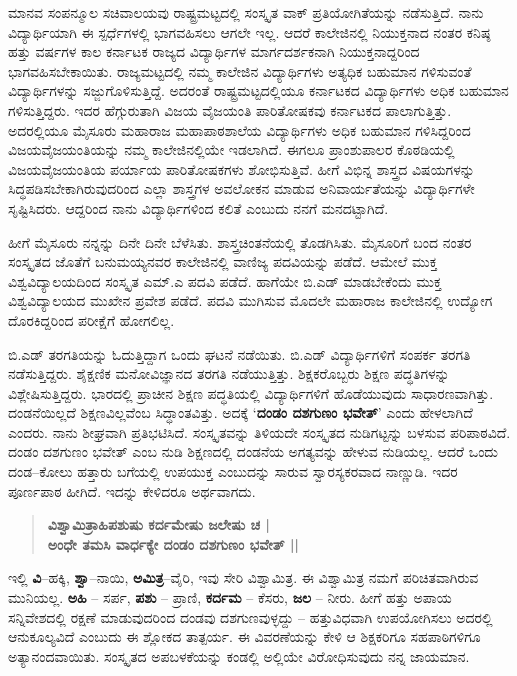 ಮಾನವ ಸಂಪನ್ಮೂಲ ಸಚಿವಾಲಯವು ರಾಷ್ಟ್ರಮಟ್ಟದಲ್ಲಿ ಸಂಸ್ಕೃತ ವಾಕ್ ಪ್ರತಿಯೋಗಿತೆಯನ್ನು ನಡೆಸುತ್ತಿದೆ.  ನಾನು ವಿದ್ಯಾರ್ಥಿಯಾಗಿ ಈ ಸ್ಪರ್ಧೆಗಳಲ್ಲಿ ಭಾಗವಹಿಸಲು ಆಗಲೇ ಇಲ್ಲ.  ಆದರೆ ಕಾಲೇಜಿನಲ್ಲಿ ನಿಯುಕ್ತನಾದ ನಂತರ ಕನಿಷ್ಠ ಹತ್ತು ವರ್ಷಗಳ ಕಾಲ ಕರ್ನಾಟಕ ರಾಜ್ಯದ ವಿದ್ಯಾರ್ಥಿಗಳ ಮಾರ್ಗದರ್ಶಕನಾಗಿ ನಿಯುಕ್ತನಾದ್ದರಿಂದ ಭಾಗವಹಿಸಬೇಕಾಯಿತು.  ರಾಜ್ಯಮಟ್ಟದಲ್ಲಿ ನಮ್ಮ ಕಾಲೇಜಿನ ವಿದ್ಯಾರ್ಥಿಗಳು ಅತ್ಯಧಿಕ ಬಹುಮಾನ ಗಳಿಸುವಂತೆ ವಿದ್ಯಾರ್ಥಿಗಳನ್ನು ಸಜ್ಜುಗೊಳಿಸುತ್ತಿದ್ದೆ.  ಅದರಂತೆ ರಾಷ್ಟ್ರಮಟ್ಟದಲ್ಲಿಯೂ ಕರ್ನಾಟಕದ ವಿದ್ಯಾರ್ಥಿಗಳು ಅಧಿಕ ಬಹುಮಾನ ಗಳಿಸುತ್ತಿದ್ದರು.  ಇದರ ಹೆಗ್ಗುರುತಾಗಿ ವಿಜಯ ವೈಜಯಂತಿ ಪಾರಿತೋಷಕವು ಕರ್ನಾಟಕದ ಪಾಲಾಗುತ್ತಿತ್ತು.  ಅದರಲ್ಲಿಯೂ ಮೈಸೂರು ಮಹಾರಾಜ ಮಹಾಪಾಠಶಾಲೆಯ ವಿದ್ಯಾರ್ಥಿಗಳು ಅಧಿಕ ಬಹುಮಾನ ಗಳಿಸಿದ್ದರಿಂದ ವಿಜಯವೈಜಯಂತಿಯನ್ನು ನಮ್ಮ ಕಾಲೇಜಿನಲ್ಲಿಯೇ ಇಡಲಾಗಿದೆ.  ಈಗಲೂ ಪ್ರಾಂಶುಪಾಲರ ಕೊಠಡಿಯಲ್ಲಿ ವಿಜಯವೈಜಯಂತಿಯ ಪರ್ಯಾಯ ಪಾರಿತೋಷಕಗಳು ಶೋಭಿಸುತ್ತಿವೆ.  ಹೀಗೆ ವಿಭಿನ್ನ ಶಾಸ್ತ್ರದ ವಿಷಯಗಳನ್ನು ಸಿದ್ಧಪಡಿಸಬೇಕಾಗಿರುವುದರಿಂದ ಎಲ್ಲಾ ಶಾಸ್ತ್ರಗಳ ಅವಲೋಕನ ಮಾಡುವ ಅನಿವಾರ್ಯತೆಯನ್ನು ವಿದ್ಯಾರ್ಥಿಗಳೇ ಸೃಷ್ಟಿಸಿದರು.   ಆದ್ದರಿಂದ ನಾನು ವಿದ್ಯಾರ್ಥಿಗಳಿಂದ ಕಲಿತೆ ಎಂಬುದು ನನಗೆ ಮನದಟ್ಟಾಗಿದೆ.  

ಹೀಗೆ ಮೈಸೂರು ನನ್ನನ್ನು ದಿನೇ ದಿನೇ ಬೆಳೆಸಿತು.  ಶಾಸ್ತ್ರಚಿಂತನೆಯಲ್ಲಿ ತೊಡಗಿಸಿತು.  ಮೈಸೂರಿಗೆ ಬಂದ ನಂತರ ಸಂಸ್ಕೃತದ ಜೊತೆಗೆ ಬನುಮಯ್ಯನವರ ಕಾಲೇಜಿನಲ್ಲಿ ವಾಣಿಜ್ಯ ಪದವಿಯನ್ನು ಪಡೆದೆ. ಆಮೇಲೆ ಮುಕ್ತ ವಿಶ್ವವಿದ್ಯಾಲಯದಿಂದ ಸಂಸ್ಕೃತ ಎಮ್.ಎ ಪದವಿ ಪಡೆದೆ. ಹಾಗೆಯೇ ಬಿ.ಎಡ್ ಮಾಡಬೇಕೆಂದು ಮುಕ್ತ ವಿಶ್ವವಿದ್ಯಾಲಯದ ಮುಖೇನ ಪ್ರವೇಶ ಪಡೆದೆ. ಪದವಿ ಮುಗಿಸುವ ಮೊದಲೇ ಮಹಾರಾಜ ಕಾಲೇಜಿನಲ್ಲಿ ಉದ್ಯೋಗ ದೊರಕಿದ್ದರಿಂದ ಪರೀಕ್ಷೆಗೆ ಹೋಗಲಿಲ್ಲ.  

ಬಿ.ಎಡ್ ತರಗತಿಯನ್ನು ಓದುತ್ತಿದ್ದಾಗ ಒಂದು ಘಟನೆ ನಡೆಯಿತು.  ಬಿ.ಎಡ್ ವಿದ್ಯಾರ್ಥಿಗಳಿಗೆ ಸಂಪರ್ಕ ತರಗತಿ ನಡೆಸುತ್ತಿದ್ದರು. ಶೈಕ್ಷಣಿಕ ಮನೋವಿಜ್ಞಾನದ ತರಗತಿ ನಡೆಯುತ್ತಿತ್ತು.  ಶಿಕ್ಷಕರೊಬ್ಬರು ಶಿಕ್ಷಣ ಪದ್ಧತಿಗಳನ್ನು ವಿಶ್ಲೇಷಿಸುತ್ತಿದ್ದರು.  ಭಾರದಲ್ಲಿ ಪ್ರಾಚೀನ ಶಿಕ್ಷಣ ಪದ್ಧತಿಯಲ್ಲಿ ವಿದ್ಯಾರ್ಥಿಗಳಿಗೆ ಹೊಡೆಯುವುದು ಸಾಧಾರಣವಾಗಿತ್ತು. ದಂಡನೆಯಿಲ್ಲದೆ ಶಿಕ್ಷಣವಿಲ್ಲವೆಂಬ ಸಿದ್ಧಾಂತವಿತ್ತು.  ಅದಕ್ಕೆ ‘\textbf{ದಂಡಂ ದಶಗುಣಂ ಭವೇತ್}’ ಎಂದು ಹೇಳಲಾಗಿದೆ ಎಂದರು.  ನಾನು ಶೀಘ್ರವಾಗಿ ಪ್ರತಿಭಟಿಸಿದೆ.  ಸಂಸ್ಕೃತವನ್ನು ತಿಳಿಯದೇ ಸಂಸ್ಕೃತದ ನುಡಿಗಟ್ಟನ್ನು ಬಳಸುವ ಪರಿಪಾಠವಿದೆ.  ದಂಡಂ ದಶಗುಣಂ ಭವೇತ್ ಎಂಬ ನುಡಿ ಶಿಕ್ಷಣದಲ್ಲಿ ದಂಡನೆಯ ಅಗತ್ಯವನ್ನು ಹೇಳುವ ನುಡಿಯಲ್ಲ.  ಆದರೆ ಒಂದು ದಂಡ–ಕೋಲು ಹತ್ತಾರು ಬಗೆಯಲ್ಲಿ ಉಪಯುಕ್ತ ಎಂಬುದನ್ನು ಸಾರುವ ಸ್ವಾರಸ್ಯಕರವಾದ ನಾಣ್ಣುಡಿ.  ಇದರ ಪೂರ್ಣಪಾಠ ಹೀಗಿದೆ.  ಇದನ್ನು ಕೇಳಿದರೂ ಅರ್ಥವಾಗದು. 
\begin{verse}
{\kannadafont\bfseries ವಿಶ್ವಾಮಿತ್ರಾಹಿಪಶುಷು ಕರ್ದಮೇಷು ಜಲೇಷು ಚ  |\\
ಅಂಧೇ ತಮಸಿ ವಾರ್ಧಕ್ಯೇ ದಂಡಂ ದಶಗುಣಂ ಭವೇತ್ ||}
\end{verse}
ಇಲ್ಲಿ \textbf{ವಿ}–ಹಕ್ಕಿ, \textbf{ಶ್ವಾ}–ನಾಯಿ, \textbf{ಅಮಿತ್ರ}–ವೈರಿ, ಇವು ಸೇರಿ ವಿಶ್ವಾಮಿತ್ರ.  ಈ ವಿಶ್ವಾಮಿತ್ರ ನಮಗೆ ಪರಿಚಿತವಾಗಿರುವ ಮುನಿಯಲ್ಲ.  \textbf{ಅಹಿ} – ಸರ್ಪ, \textbf{ಪಶು} – ಪ್ರಾಣಿ, \textbf{ಕರ್ದಮ} – ಕೆಸರು, \textbf{ಜಲ} – ನೀರು.  ಹೀಗೆ ಹತ್ತು ಅಪಾಯ ಸನ್ನಿವೇಶದಲ್ಲಿ ರಕ್ಷಣೆ ಮಾಡುವುದರಿಂದ ದಂಡವು ದಶಗುಣವುಳ್ಳದ್ದು – ಹತ್ತುವಿಧವಾಗಿ ಉಪಯೋಗಿಸಲು ಅದರಲ್ಲಿ ಆನುಕೂಲ್ಯವಿದೆ ಎಂಬುದು ಈ ಶ್ಲೋಕದ ತಾತ್ಪರ್ಯ.   ಈ ವಿವರಣೆಯನ್ನು ಕೇಳಿ ಆ ಶಿಕ್ಷಕರಿಗೂ ಸಹಪಾಠಿಗಳಿಗೂ ಅತ್ಯಾನಂದವಾಯಿತು.  ಸಂಸ್ಕೃತದ ಅಪಬಳಕೆಯನ್ನು ಕಂಡಲ್ಲಿ ಅಲ್ಲಿಯೇ ವಿರೋಧಿಸುವುದು ನನ್ನ ಜಾಯಮಾನ.  


